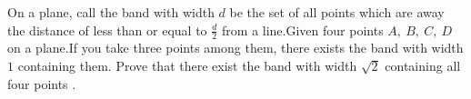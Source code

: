 On a plane, call the band with width $d$ be the set of all points which are away the distance of less than or equal to $\frac{d}{2}$ from a line.Given four points $A,\ B,\ C,\ D$ on a plane.If you take three points among them, there exists the band with width $1$ containing them. Prove that there exist the band with width $\sqrt{2}$ containing all four points .